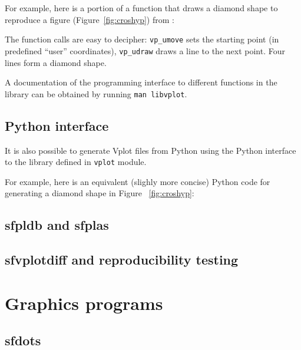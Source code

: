 For example, here is a portion of a function that draws a diamond
shape to reproduce a figure (Figure~\ref{fig:croshyp}) from \cite[]{bei}:

\lstset{language=c,numbers=left,numberstyle=\tiny,showstringspaces=false}


The function calls are easy to decipher: \texttt{vp\_umove} sets the
starting point (in predefined ``user'' coordinates),
\texttt{vp\_udraw} draws a line to the next point. Four lines form a
diamond shape.


A documentation of the programming interface to different functions in
the library can be obtained by running \texttt{man libvplot}.

\subsection{Python interface}

It is also possible to generate Vplot files from Python using the
Python interface to the library defined in \texttt{vplot} module.

For example, here is an equivalent (slighly more concise) Python code
for generating a diamond shape in Figure ~\ref{fig:croshyp}:

\lstset{language=python,numbers=left,numberstyle=\tiny,showstringspaces=false}


\subsection{sfpldb and sfplas}

\subsection{sfvplotdiff and reproducibility testing}

\section{Graphics programs}

\subsection{sfdots}

